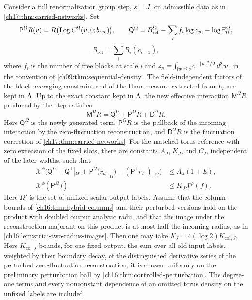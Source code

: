 \begin{theorem}\label{ch17:thm:quantum-ledger}
Consider a full renormalization group step, $s=J$, on admissible data as in \cref{ch17:thm:carried-networks}. Set
\[
 \mathsf P^\Omega R(v)=R\bigl(\operatorname{Log} C^\Omega(v,0;b_{\mathrm{rec}})\bigr),\qquad
 \mathsf Q^\Omega=B_{\mathrm{ref}}^\Omega-\sum_if_i\log z_{p_i}-\log\Xi_0^\Omega,
\]
\[
 B_{\mathrm{ref}}=\sum_iB_i(\widehat c_{i+1}),
\]
where $f_i$ is the number of free blocks at scale $i$ and $z_p=\int_{\lvert w\rvert\le p}e^{-\lvert w\rvert^2/2}\,d^3w$, in the convention of \cref{ch09:thm:sequential-density}. The field-independent factors of the block averaging constraint and of the Haar measure extracted from $L_i$ are kept in $\Lambda$. Up to the exact constant kept in $\Lambda$, the new effective interaction $\mathsf M^\Omega R$ produced by the step satisfies
\[
 \mathsf M^\Omega R=\mathsf Q^\Omega+\mathsf P^\Omega R+\mathsf D^\Omega R.
\]
Here $\mathsf Q^\Omega$ is the newly generated term, $\mathsf P^\Omega R$ is the pullback of the incoming interaction by the zero-fluctuation reconstruction, and $\mathsf D^\Omega R$ is the fluctuation correction of \cref{ch17:thm:carried-networks}. For the matched torus reference with zero extension of the fixed slots, there are constants $A_J$, $K_J$, and $C_J$, independent of the later widths, such that
\begin{align*}
 \mathcal X^\phi\bigl(\mathsf Q^\Omega-\mathsf Q^{\mathbb T}|_{\Omega'}+\mathsf P^\Omega(r_{d_0}|_\Omega)-(\mathsf P^{\mathbb T}r_{d_0})|_{\Omega'}\bigr)&\le A_J(1+E),\\
 \mathcal X^\phi(\mathsf P^\Omega f)&\le K_J\mathcal X^\rho(f).
\end{align*}
Here $\Omega'$ is the set of unfixed scalar output labels. Assume that the column bounds of \cref{ch16:thm:hybrid-columns} and their perturbed versions hold on the product with doubled output analytic radii, and that the image under the reconstruction majorant on this product is at most half the incoming radius, as in \cref{ch16:lem:strict-two-radius-images}. Then one may take $K_J=4(\log2)K_{\mathrm{col},J}$. Here $K_{\mathrm{col},J}$ bounds, for one fixed output, the sum over all old input labels, weighted by their boundary decay, of the distinguished derivative series of the perturbed zero-fluctuation reconstruction; it is chosen uniformly on the preliminary perturbation ball by \cref{ch16:thm:controlled-perturbation}. The degree-one terms and every nonconstant dependence of an omitted torus density on the unfixed labels are included.


\end{theorem}
